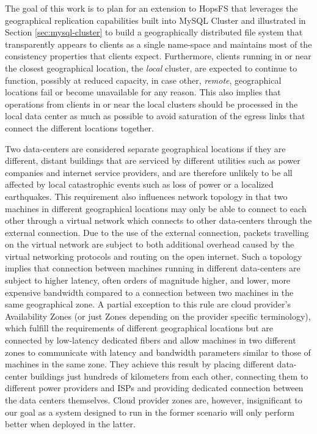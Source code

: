 The goal of this work is to plan for an extension to HopsFS that leverages the geographical replication capabilities built into MySQL Cluster and illustrated in Section \ref{sec:mysql-cluster} to build a geographically distributed file system that transparently appears to clients as a single name-space and maintains most of the consistency properties that clients expect.
Furthermore, clients running in or near the closest geographical location, the \emph{local} cluster, are expected to continue to function, possibly at reduced capacity, in case other, \emph{remote}, geographical locations fail or become unavailable for any reason.
This also implies that operations from clients in or near the local clusters should be processed in the local data center as much as possible to avoid saturation of the egress links that connect the different locations together.

Two data-centers are considered separate geographical locations if they are different, distant buildings that are serviced by different utilities such as power companies and internet service providers, and are therefore unlikely to be all affected by local catastrophic events such as loss of power or a localized earthquakes.
This requirement also influences network topology in that two machines in different geographical locations may only be able to connect to each other through a virtual network which connects to other data-centers through the external connection.
Due to the use of the external connection, packets travelling on the virtual network are subject to both additional overhead caused by the virtual networking protocols and routing on the open internet.
Such a topology implies that connection between machines running in different data-centers are subject to higher latency, often orders of magnitude higher, and lower, more expensive bandwidth compared to a connection between two machines in the same geographical zone.
A partial exception to this rule are cloud provider's Availability Zones (or just Zones depending on the provider specific terminology), which fulfill the requirements of different geographical locations but are connected by low-latency dedicated fibers and allow machines in two different zones to communicate with latency and bandwidth parameters similar to those of machines in the same zone.
They achieve this result by placing different data-center buildings just hundreds of kilometers from each other, connecting them to different power providers and ISPs and providing dedicated connection between the data centers themselves.
Cloud provider zones are, however, insignificant to our goal as a system designed to run in the former scenario will only perform better when deployed in the latter.

